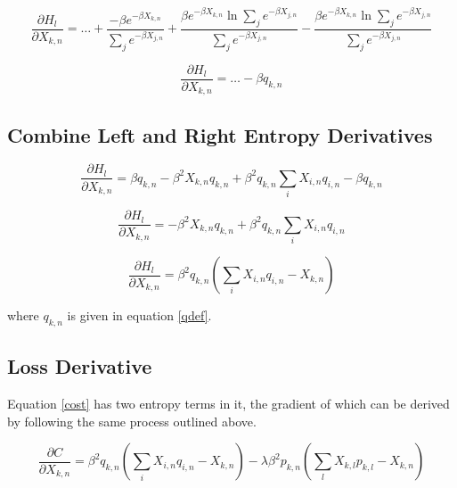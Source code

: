 \begin{displaymath}
    \frac{\partial H_{l}}{\partial X_{k,n}} = \ldots + 
    \frac{-\beta e^{-\beta X_{k,n}}}{\sum_{j}e^{-\beta X_{j,n}}}
    + \frac{\beta e^{-\beta X_{k,n}}\ln{\sum_{j}e^{-\beta X_{j,n}}}}{\sum_{j}e^{-\beta X_{j,n}}}
    - \frac{\beta e^{-\beta X_{k,n}}\ln{\sum_{j}e^{-\beta X_{j,n}}}}{\sum_{j}e^{-\beta X_{j,n}}}
\end{displaymath}

\begin{equation}
    \frac{\partial H_{l}}{\partial X_{k,n}} = \ldots - \beta q_{k,n}
\label{rightd}
\end{equation}

\subsection{Combine Left and Right Entropy Derivatives}

\begin{displaymath}
    \frac{\partial H_{l}}{\partial X_{k,n}} = \beta q_{k,n} - \beta^{2} X_{k,n} q_{k,n} + \beta^{2} q_{k,n} \sum_{i}X_{i,n}q_{i,n} - \beta q_{k,n}
\end{displaymath}

\begin{displaymath}
    \frac{\partial H_{l}}{\partial X_{k,n}} = - \beta^{2}X_{k,n}q_{k,n} + \beta^{2}q_{k,n}\sum_{i}X_{i,n}q_{i,n}
\end{displaymath}

\begin{equation}
    \frac{\partial H_{l}}{\partial X_{k,n}} = \beta^{2}q_{k,n}\left(\sum_{i}X_{i,n}q_{i,n} - X_{k,n}\right)
\label{combd}
\end{equation}

\noindent where $q_{k,n}$ is given in equation \ref{qdef}.

\subsection{Loss Derivative}
\noindent Equation \ref{cost} has two entropy terms in it, the gradient of which can be derived by following the same process outlined above.

\begin{displaymath}
    \frac{\partial C}{\partial X_{k,n}} = \beta^{2} q_{k,n} \left(\sum_{i}X_{i,n}q_{i,n} - X_{k,n}\right) - \lambda \beta^{2} p_{k,n} \left( \sum_{l}X_{k,l}p_{k,l} - X_{k,n}\right)
\end{displaymath}

